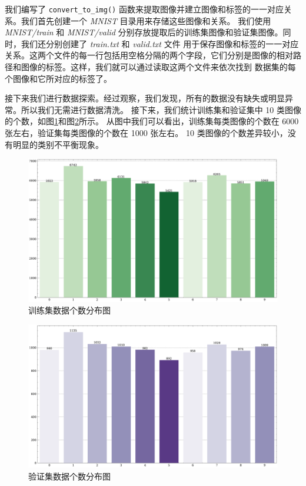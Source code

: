 \documentclass[supercite]{Experimental_Report}
\theoremstyle{definition}
\begin{document}
我们编写了 \texttt{convert\_to\_img()} 函数来提取图像并建立图像和标签的一一对应关系。我们首先创建一个 \emph{MNIST} 目录用来存储这些图像和关系。
我们使用 \emph{MNIST/train} 和 \emph{MNIST/valid} 分别存放提取后的训练集图像和验证集图像。同时，我们还分别创建了 \emph{train.txt} 和 \emph{valid.txt} 文件
用于保存图像和标签的一一对应关系。这两个文件的每一行包括用空格分隔的两个字段，它们分别是图像的相对路径和图像的标签。这样，我们就可以通过读取这两个文件来依次找到
数据集的每个图像和它所对应的标签了。

接下来我们进行数据探索。经过观察，我们发现，所有的数据没有缺失或明显异常。所以我们无需进行数据清洗。
接下来，我们统计训练集和验证集中 10 类图像的个数，如图\ref{训练集数据个数分布图}和图\ref{验证集数据个数分布图}所示。
从图中我们可以看出，训练集每类图像的个数在 6000 张左右，验证集每类图像的个数在 1000 张左右。
10 类图像的个数差异较小，没有明显的类别不平衡现象。
\begin{figure}[H]
	\begin{center}
		\includegraphics[scale=0.4]{../images/训练集数据个数分布图.pdf}
		\caption{训练集数据个数分布图}
		\label{训练集数据个数分布图}
	\end{center}
\end{figure}
\begin{figure}[H]
	\begin{center}
		\includegraphics[scale=0.4]{../images/验证集数据个数分布图.pdf}
		\caption{验证集数据个数分布图}
		\label{验证集数据个数分布图}
	\end{center}
\end{figure}
\end{document}
